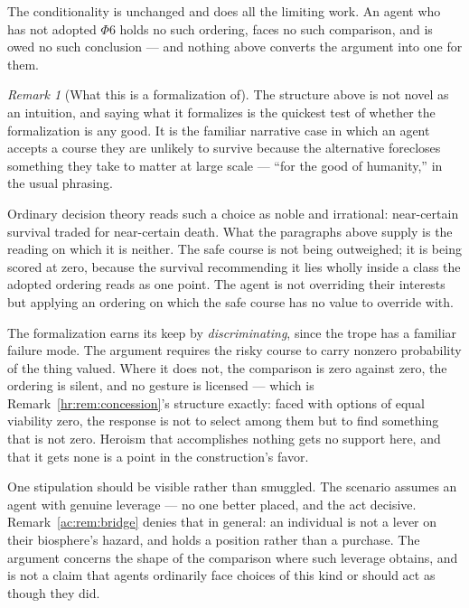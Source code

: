 \documentclass[11pt]{article}
\numberwithin{equation}{section}
\theoremstyle{plain}
\theoremstyle{definition}
\theoremstyle{remark}
\newtheorem{remark}[theorem]{Remark}
\begin{document}
The conditionality is unchanged and does all the limiting work. An agent
who has not adopted $\Phi6$ holds no such ordering, faces no such
comparison, and is owed no such conclusion --- and nothing above
converts the argument into one for them.

\begin{remark}[What this is a formalization of]\label{gs:rem:trope}
The structure above is not novel as an intuition, and saying what it
formalizes is the quickest test of whether the formalization is any
good. It is the familiar narrative case in which an agent accepts a
course they are unlikely to survive because the alternative forecloses
something they take to matter at large scale --- ``for the good of
humanity,'' in the usual phrasing.

Ordinary decision theory reads such a choice as noble and irrational:
near-certain survival traded for near-certain death. What the paragraphs
above supply is the reading on which it is neither. The safe course is
not being outweighed; it is being scored at zero, because the survival
recommending it lies wholly inside a class the adopted ordering reads as
one point. The agent is not overriding their interests but applying an
ordering on which the safe course has no value to override with.

The formalization earns its keep by \emph{discriminating}, since the
trope has a familiar failure mode. The argument requires the risky course
to carry nonzero probability of the thing valued. Where it does not, the
comparison is zero against zero, the ordering is silent, and no gesture
is licensed --- which is Remark~\ref{hr:rem:concession}'s structure
exactly: faced with options of equal viability zero, the response is not
to select among them but to find something that is not zero. Heroism
that accomplishes nothing gets no support here, and that it gets none is
a point in the construction's favor.

One stipulation should be visible rather than smuggled. The scenario
assumes an agent with genuine leverage --- no one better placed, and the
act decisive. Remark~\ref{ac:rem:bridge} denies that in general: an
individual is not a lever on their biosphere's hazard, and holds a
position rather than a purchase. The argument concerns the shape of the
comparison where such leverage obtains, and is not a claim that agents
ordinarily face choices of this kind or should act as though they did.
\end{remark}

\end{document}
